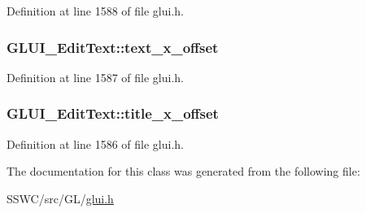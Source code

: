 Definition at line 1588 of file glui.\+h.

\hypertarget{class_g_l_u_i___edit_text_ad9e34b0c8c1636883b6cb8c6e8eaae7d}{
\subsubsection[{text\+\_\+x\+\_\+offset}]{ G\+L\+U\+I\+\_\+\+Edit\+Text\+::text\+\_\+x\+\_\+offset}}\label{class_g_l_u_i___edit_text_ad9e34b0c8c1636883b6cb8c6e8eaae7d}


Definition at line 1587 of file glui.\+h.

\hypertarget{class_g_l_u_i___edit_text_aed30e771b57b3a9bcc708fba638666e6}{
\subsubsection[{title\+\_\+x\+\_\+offset}]{ G\+L\+U\+I\+\_\+\+Edit\+Text\+::title\+\_\+x\+\_\+offset}}\label{class_g_l_u_i___edit_text_aed30e771b57b3a9bcc708fba638666e6}


Definition at line 1586 of file glui.\+h.



The documentation for this class was generated from the following file\+:\begin{DoxyCompactItemize}
\item 
S\+S\+W\+C/src/\+G\+L/\hyperlink{glui_8h}{glui.\+h}\end{DoxyCompactItemize}
